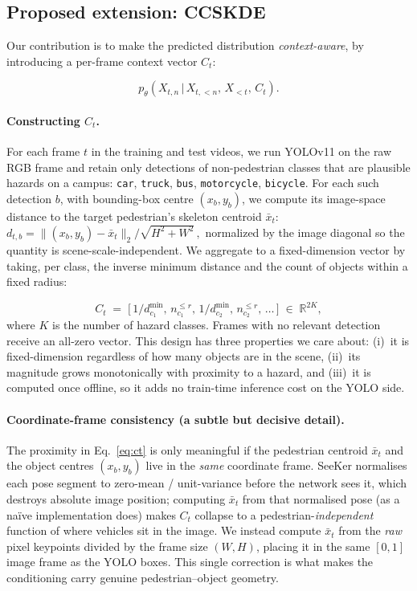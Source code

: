 \documentclass{article}
\begin{document}
\subsection{Proposed extension: CCSKDE}
\label{ssec:ccskde}

Our contribution is to make the predicted distribution
\emph{context-aware}, by introducing a per-frame context vector $C_t$:

\begin{equation}
\label{eq:ccskde_factor}
p_{\theta}\!\left(X_{t,n}\,\big|\, X_{t,<n},\, X_{<t},\, C_t\right).
\end{equation}

\paragraph{Constructing $C_t$.}
For each frame $t$ in the training and test videos, we run YOLOv11 on the raw
RGB frame and retain only detections of non-pedestrian classes that are
plausible hazards on a campus: \texttt{car}, \texttt{truck}, \texttt{bus},
\texttt{motorcycle}, \texttt{bicycle}. For each such detection $b$, with
bounding-box centre $(x_b, y_b)$, we compute its image-space distance to the
target pedestrian's skeleton centroid $\bar{x}_t$:
\(
d_{t,b} = \lVert (x_b, y_b) - \bar{x}_t \rVert_2 / \sqrt{H^2 + W^2}\,,
\)
normalized by the image diagonal so the quantity is scene-scale-independent.
We aggregate to a fixed-dimension vector by taking, per class,
the inverse minimum distance and the count of objects within a fixed radius:

\begin{equation}
\label{eq:ct}
C_t \;=\; \big[\,1/d^{\min}_{c_1},\,n^{\le r}_{c_1},\,
                 1/d^{\min}_{c_2},\,n^{\le r}_{c_2},\,\dots\,\big]
\;\in\;\mathbb{R}^{2K},
\end{equation}
where $K$ is the number of hazard classes. Frames with no relevant
detection receive an all-zero vector. This design has three properties we
care about: (i)~it is fixed-dimension regardless of how many objects are in
the scene, (ii)~its magnitude grows monotonically with proximity to a
hazard, and (iii)~it is computed once offline, so it adds no train-time
inference cost on the YOLO side.

\paragraph{Coordinate-frame consistency (a subtle but decisive detail).}
The proximity in Eq.~\ref{eq:ct} is only meaningful if the pedestrian
centroid $\bar{x}_t$ and the object centres $(x_b,y_b)$ live in the
\emph{same} coordinate frame. SeeKer normalises each pose segment to
zero-mean / unit-variance before the network sees it, which destroys
absolute image position; computing $\bar{x}_t$ from that normalised pose (as
a na\"ive implementation does) makes $C_t$ collapse to a
pedestrian-\emph{independent} function of where vehicles sit in the image.
We instead compute $\bar{x}_t$ from the \emph{raw} pixel keypoints divided by
the frame size $(W,H)$, placing it in the same $[0,1]$ image frame as the
YOLO boxes. This single correction is what makes the conditioning carry
genuine pedestrian--object geometry.
\end{document}
